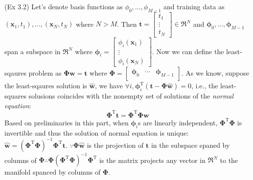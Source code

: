 (Ex 3.2) Let's denote basis functions as $\phi_0,\ldots,\phi_{M-1}$ and training data as $(\mathbf{x}_{1},t_1),\ldots,(\mathbf{x}_{N},t_N)$ where $N>M$.  Then $\mathbf{t}=\begin{bmatrix}t_1\\\vdots\\t_N\end{bmatrix}\in\Re^{N}$ and $\boldsymbol{\phi}_{0},\ldots,\boldsymbol{\phi}_{M-1}$ span a subspace in $\Re^{N}$ where $\boldsymbol{\phi}_{i}=\begin{bmatrix}\phi_{i}(\mathbf{x}_1)\\\vdots\\\phi_{i}(\mathbf{x}_N)\end{bmatrix}$. Now we can define the least-sqaures problem as $\boldsymbol{\Phi}\mathbf{w}=\mathbf{t}$ where $\boldsymbol{\Phi}=\begin{bmatrix}\boldsymbol{\phi}_{0}&\cdots&\boldsymbol{\phi}_{M-1}\\\end{bmatrix}$.  As we know, suppose the least-sqaures solution is $\mathbf{\hat{w}}$, we have $\forall{}i,\boldsymbol{\phi}_{i}^{\mathrm{T}}(\mathbf{t}-\boldsymbol{\Phi}\mathbf{\hat{w}})=0$, i.e., the least-squares solusions coincides with the nonempty set of solutions of the \emph{normal equation}:
\begin{equation}
\boldsymbol{\Phi}^{\mathrm{T}}\mathbf{t}=\boldsymbol{\Phi}^{\mathrm{T}}\boldsymbol{\Phi}\mathbf{w}
\end{equation}
Based on preliminaries in this part, when $\boldsymbol{\phi}_i$s are linearly independent, $\boldsymbol{\Phi}^{\mathrm{T}}\boldsymbol{\Phi}$ is invertible and thus the solution of normal equation is unique: $\mathbf{\hat{w}}=(\boldsymbol{\Phi}^{\mathrm{T}}\boldsymbol{\Phi})^{-1}\boldsymbol{\Phi}^{\mathrm{T}}\mathbf{t}$. $\because{}\boldsymbol{\Phi}\mathbf{\hat{w}}$ is the projection of $\mathbf{t}$ in the subspace spaned by columns of $\boldsymbol{\Phi}\therefore{}\boldsymbol{\Phi}(\boldsymbol{\Phi}^{\mathrm{T}}\boldsymbol{\Phi})^{-1}\boldsymbol{\Phi}^{\mathrm{T}}$ is the matrix projects any vector in $\Re^{N}$ to the manifold spanced by columns of $\boldsymbol{\Phi}$.
